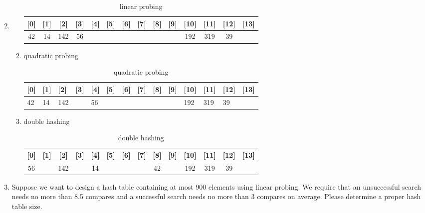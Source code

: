 \documentclass[12pt,a4paper]{article}
\makeatletter
\newtheorem*{solution}{Solution}
\theoremstyle{definition}
\renewenvironment{solution}[1][Solution] {\par\pushQED{\qed}\normalfont\topsep6\p@\@plus6\p@\relax\trivlist\item[\hskip\labelsep\bfseries#1\@addpunct{.}]\ignorespaces}{\popQED\endtrivlist\@endpefalse} \makeatother
\makeatother
\begin{document}
\begin{enumerate}
\begin{solution}
\begin{enumerate}
			\begin{table}[h]
			\centering
			\begin{tabular}{|c|c|c|c|c|c|c|c|c|c|c|c|c|c|}
			\hline
			{[}0{]} & {[}1{]} & {[}2{]} & {[}3{]} & {[}4{]} & {[}5{]} & {[}6{]} & {[}7{]} & {[}8{]} & {[}9{]} & {[}10{]} & {[}11{]} & {[}12{]} & {[}13{]} \\ \hline
			42      & 14      & 142     & 56      &         &         &         &         &         &         & 192      & 319      & 39       &          \\ \hline
			\end{tabular}
			\caption{linear probing}
			\label{lb14}
			\end{table}
			\newpage
		\item quadratic probing
			\begin{table}[h]
			\centering
			\begin{tabular}{|l|l|l|l|l|l|l|l|l|l|l|l|l|l|}
			\hline
			{[}0{]} & {[}1{]} & {[}2{]} & {[}3{]} & {[}4{]} & {[}5{]} & {[}6{]} & {[}7{]} & {[}8{]} & {[}9{]} & {[}10{]} & {[}11{]} & {[}12{]} & {[}13{]} \\ \hline
			42      & 14      & 142     &         & 56      &         &         &         &         &         & 192      & 319      & 39       &          \\ \hline
			\end{tabular}
			\caption{quadratic probing}
			\label{qp14}
			\end{table}
			
		\item double hashing
			\begin{table}[h]
			\centering
			\begin{tabular}{|c|c|c|c|c|c|c|c|c|c|c|c|c|c|}
			\hline
			{[}0{]} & {[}1{]} & {[}2{]} & {[}3{]} & {[}4{]} & {[}5{]} & {[}6{]} & {[}7{]} & {[}8{]} & {[}9{]} & {[}10{]} & {[}11{]} & {[}12{]} & {[}13{]} \\ \hline
			56      &         & 142     &         & 14      &         &         &         & 42      &         & 192      & 319      & 39       &          \\ \hline
			\end{tabular}
			\caption{double hashing}
			\label{db14}
			\end{table}
	\end{enumerate}
\end{solution}

\item  Suppose we want to design a hash table containing at most 900 elements using
linear probing. We require that an unsuccessful search needs no more than 8.5 compares
and a successful search needs no more than 3 compares on average. Please determine
a proper hash table size.


\end{enumerate}
\end{document}
